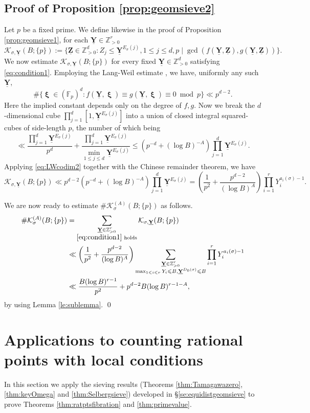 \documentclass[11pt,letterpaper]{amsart}
\newcommand{\BF}{{\mathbb {F}}}
\newcommand{\BZ}{{\mathbb {Z}}}
\newcommand{\CK}{{\mathcal {K}}}
\newcommand{\YY}{\underline{\mathbf{Y}}}
\newcommand{\ZZ}{\underline{\mathbf{Z}}}
\DeclareMathOperator{\bxi}{\mathbf{\xi}}
\theoremstyle{plain}
\numberwithin{equation}{section}
\theoremstyle{definition}
\theoremstyle{remark}
\begin{document}
\subsection{Proof of Proposition \ref{prop:geomsieve2}}\label{se:proofpropgeomsieve2}
Let $p$ be a fixed prime. We define likewise in the proof of Proposition \ref{prop:geomsieve1}, for each $\YY\in\BZ_{>0}^r$ $$\CK_{\sigma,\YY}(B;\{p\}):=
\{\ZZ\in\BZ_{>0}^d:Z_j\leqslant \YY^{E_\sigma(j)},1\leqslant j\leqslant d,p\mid\gcd( f(\YY,\ZZ),g(\YY,\ZZ))\}.$$
We now estimate $\CK_{\sigma,\YY}(B;\{p\})$ for every fixed $\YY\in\BZ_{>0}^d$ satisfying  \eqref{eq:condition1}. Employing the Lang-Weil estimate \cite{Lang-Weil}, we have, uniformly any such $\YY$, \begin{equation}\label{eq:LWcodim2}
	\#\{\bxi\in (\BF_p)^d:f(\YY,\bxi)\equiv g(\YY,\bxi)\equiv 0\bmod p\}\ll p^{d-2}.
\end{equation} Here the implied constant depends only on the degree of $f,g$. 
Now we break the $d$-dimensional cube $\prod_{j=1}^{d}\left[1, \YY^{E_\sigma(j)}\right]$ into a union of closed integral squared-cubes of side-length $p$, the number of which being 
$$\ll\frac{\prod_{j=1}^d \YY^{E_\sigma(j)}}{p^d}+\frac{\prod_{j=1}^d \YY^{E_\sigma(j)}}{\min_{1\leqslant j\leqslant d}\YY^{E_\sigma(j)}}\leqslant \left(p^{-d}+(\log B)^{-A}\right)\prod_{j=1}^d \YY^{E_\sigma(j)}.$$ Applying \eqref{eq:LWcodim2} together with the Chinese remainder theorem, we have
$$\CK_{\sigma,\YY}(B;\{p\})\ll p^{d-2}\left(p^{-d}+(\log B)^{-A}\right)\prod_{j=1}^d \YY^{E_\sigma(j)}= \left(\frac{1}{p^2}+\frac{p^{d-2}}{(\log B)^A}\right)\prod_{i=1}^{r}Y_i^{a_i(\sigma)-1}.$$

We are now ready to estimate $\#\CK_{\sigma}^{(A)}(B;\{p\})$ as follows.
\begin{align*}
	\#\CK_{\sigma}^{(A)}(B;\{p\})&=\sum_{\substack{\YY\in\BZ_{>0}^r\\ \eqref{eq:condition1}\text{ holds}}}\CK_{\sigma,\YY}(B;\{p\})\\&\ll \left(\frac{1}{p^2}+\frac{p^{d-2}}{(\log B)^A}\right)\sum_{\substack{\YY\in\BZ_{>0}^r\\\max_{1\leqslant i\leqslant r}Y_i\leqslant B, \YY^{D_0(\sigma)}\leqslant B }}\prod_{i=1}^{r}Y_i^{a_i(\sigma)-1}\\ &\ll\frac{B(\log B)^{r-1}}{p^2}+p^{d-2}B(\log B)^{r-1-A},
\end{align*} by using Lemma \ref{le:sublemma}.
\qed

\section{Applications to counting rational points with local conditions}\label{se:application}
In this section we apply the sieving results (Theorems \ref{thm:Tamagawazero}, \ref{thm:keyOmega} and \ref{thm:Selbergsieve}) developed in \S\ref{se:equidistgeomsieve} to prove Theorems \ref{thm:ratptsfibration} and \ref{thm:primevalue}.
\end{document}
